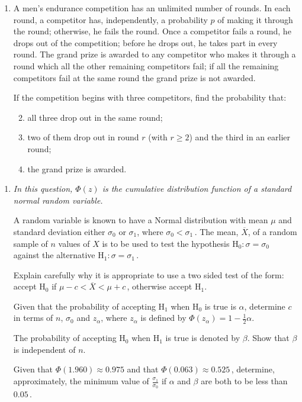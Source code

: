 \documentclass[a4, 11pt]{report}
\newlength{\qspace}
\newcounter{qnumber}
\newenvironment{question}%
 {\vspace{\qspace}
  \begin{enumerate}[\bfseries 1\quad][10]%
    \setcounter{enumi}{\value{qnumber}}%
    \item%
 }
{
  \end{enumerate}
  \filbreak
  \stepcounter{qnumber}
 }
\newenvironment{questionparts}[1][1]%
 {
  \begin{enumerate}[\bfseries (i)]%
    \setcounter{enumii}{#1}
    \addtocounter{enumii}{-1}
    \setlength{\itemsep}{5mm}
    \setlength{\parskip}{8pt}
 }
 {
  \end{enumerate}
 }
\def\ge{\geqslant}
\newcommand{\ds}{\displaystyle}
\begin{document}
\begin{question}
A men's endurance competition has an unlimited number of rounds. 
In each round, a competitor has, independently, a probability $p$ of making it through the round; 
otherwise, he fails the round. 
Once a competitor fails a round, he drops out of the competition; 
before he drops out, he takes part in every round. 
The grand prize is awarded to any competitor who makes it through a round 
which all the other remaining competitors fail; 
if all the remaining competitors fail at the same round the grand prize is not awarded.

If the competition begins with three competitors, find the probability that:
\begin{questionparts}
\item all three drop out in the same round;
\item two of them drop out in round $r$ (with $r \ge 2$) and the third in an earlier round;
\item the grand prize is awarded.
\end{questionparts}
\end{question}

\begin{question}
\textit{In this question, $\Phi(z)$ is the cumulative distribution 
function of a standard normal random variable.}

A random variable is known to have a 
Normal distribution with mean $\mu$ and standard deviation 
either $\sigma_0$ or $\sigma_1$, where $\sigma_0 < \sigma_1\,$. 
The mean, $\overline{X}$, of a random sample of $n$ values of $X$ 
is to be used to test the hypothesis 
$\mathrm{H}_0: \sigma = \sigma_0$ against the alternative $\mathrm{H}_1: \sigma = \sigma_1\,$.

Explain carefully why it is appropriate 
to use a two sided test of the form: 
accept $\mathrm{H}_0$ if \phantom{} $\mu - c < \overline{X} < \mu+c\,$, otherwise accept $\mathrm{H}_1$.

Given that the probability of accepting $\mathrm{H}_1$ 
when $\mathrm{H}_0$ is true is $\alpha$, 
determine $c$ in terms of $n$,  $\sigma_0$ and $z_{\alpha}$, where 
$z_\alpha $ is defined by $\ds\Phi(z_{\alpha}) = 1 - \tfrac{1}{2}\alpha$.

The probability of accepting $\mathrm{H}_0$ when $\mathrm{H}_1$ is true
is denoted by $\beta$. Show that $\beta$ is independent of $n$.

Given that $\Phi(1.960)\approx 0.975$ and that $\Phi(0.063) \approx 0.525\,$, 
determine, approximately, the minimum value of $\ds \frac{\sigma_1}{\sigma_0}$ 
if $\alpha$ and $\beta$ are both to be less than $0.05\,$.
\end{question}
	
\end{document}
